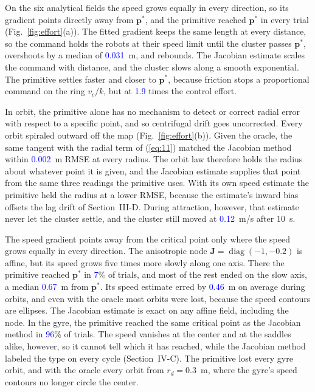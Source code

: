 \documentclass[lettersize,journal]{IEEEtran}
\newcommand{\rev}[1]{#1}                             %
\newcommand{\newnum}[1]{\textcolor{blue}{#1}}        %
\begin{document}
On the six analytical fields the speed grows equally in every direction, so its gradient points directly away from $\mathbf{p}^*$, and the primitive reached $\mathbf{p}^*$ in every trial (Fig.~\ref{fig:effort}(a)). The fitted gradient keeps the same length at every distance, so the command holds the robots at their speed limit until the cluster passes $\mathbf{p}^*$, overshoots by a median of \newnum{0.031}~m, and rebounds. The Jacobian estimate scales the command with distance, and the cluster slows along a smooth exponential. The primitive settles faster and closer to $\mathbf{p}^*$, because friction stops a proportional command on the ring $v_c/k$, but at \newnum{1.9} times the control effort. %

In orbit, the primitive alone has no mechanism to detect or correct radial error with respect to a specific point, and so centrifugal drift goes uncorrected. Every orbit spiraled outward off the map (Fig.~\ref{fig:effort}(b)). Given the oracle, the same tangent with the radial term of (\ref{eq:11}) matched the Jacobian method within \newnum{0.002}~m RMSE at every radius. The orbit law therefore holds the radius about whatever point it is given, and the Jacobian estimate supplies that point from the same three readings the primitive uses. With its own speed estimate the primitive held the radius at a lower RMSE, because the estimate's inward bias offsets the lag drift of Section~III-D. During attraction, however, that estimate never let the cluster settle, and the cluster still moved at \newnum{0.12}~m/s after 10~s. %

The speed gradient points away from the critical point only where the speed grows equally in every direction. The anisotropic node $\mathbf{J} = \operatorname{diag}(-1, -0.2)$ is affine, but its speed grows five times more slowly along one axis. There the primitive reached $\mathbf{p}^*$ in \newnum{7}\% of trials, and most of the rest ended on the slow axis, a median \newnum{0.67}~m from $\mathbf{p}^*$. Its speed estimate erred by \newnum{0.46}~m on average during orbits, and even with the oracle most orbits were lost, because the speed contours are ellipses. The Jacobian estimate is exact on any affine field, including the node. In the gyre, the primitive reached the same critical point as the Jacobian method in \newnum{96}\% of trials. The speed vanishes at the center and at the saddles alike, however, so it cannot tell which it has reached, while the Jacobian method labeled the type on every cycle (Section~IV-C). The primitive lost every gyre orbit, and with the oracle every orbit from $r_d = 0.3$~m, where the gyre's speed contours no longer circle the center. %
\end{document}
